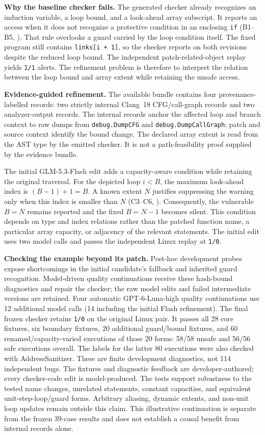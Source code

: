 \textbf{Why the baseline checker fails.}
The generated checker already recognizes an induction variable, a loop
bound, and a look-ahead array subscript. It reports an access when it does
not recognize a protective condition in an enclosing \lstinline|if|
(B1--B5, ). That rule overlooks a guard carried by the loop
condition itself. The fixed program still contains \lstinline|links[i + 1]|,
so the checker reports on both revisions despite the reduced loop bound.
The independent patch-related-object replay yields \texttt{1/1} alerts.
The refinement problem is therefore to interpret the relation between
the loop bound and array extent while retaining the unsafe access.

\textbf{Evidence-guided refinement.}
The available bundle contains four provenance-labelled records: two
strictly internal Clang~18 CFG/call-graph records and two analyzer-output
records. The internal records anchor the affected loop and branch context
to raw dumps from \texttt{debug.DumpCFG} and
\texttt{debug.DumpCallGraph}; patch and source context identify the bound
change. The declared array extent is read from the AST type by the emitted
checker. It is not a path-feasibility proof supplied by the evidence bundle.

The initial GLM-5.3-Flash edit adds a capacity-aware condition while
retaining the original traversal. For the depicted loop $i<B$, the maximum
look-ahead index is $(B-1)+1=B$. A known extent $N$ justifies suppressing the
warning only when this index is smaller than $N$ (C3--C6, ).
Consequently, the vulnerable $B=N$ remains reported and the fixed $B=N-1$
becomes silent. This condition depends on type and index relations rather
than the patched function name, a particular array capacity, or adjacency
of the relevant statements. The initial edit uses two model calls and
passes the independent Linux replay at \texttt{1/0}.

\textbf{Checking the example beyond its patch.}
Post-hoc development probes expose shortcomings in the initial candidate's
fallback and inherited guard recognition. Model-driven quality
continuations receive these hash-bound diagnostics and repair the checker;
the raw model edits and failed intermediate versions are retained.
Four automatic GPT-6-Luna-high quality continuations use 12 additional
model calls (14 including the initial Flash refinement). The final frozen
checker retains \texttt{1/0} on the original Linux pair. It passes all 28
core fixtures, six boundary fixtures, 20 additional guard/bound fixtures,
and 60 renamed/capacity-varied executions of those 20 forms: 58/58 unsafe
and 56/56 safe executions overall. The labels for the latter 80 executions
were also checked with AddressSanitizer. These are finite development
diagnostics, not 114 independent bugs. The fixtures and diagnostic feedback
are developer-authored; every checker-code edit is model-produced.
The tests support robustness to the tested name changes, unrelated
statements, constant capacities, and equivalent unit-step-loop/guard forms.
Arbitrary aliasing, dynamic extents, and non-unit loop updates remain
outside this claim. This illustrative continuation is separate from the
frozen 39-case results and does not establish a causal benefit from internal
records alone.
